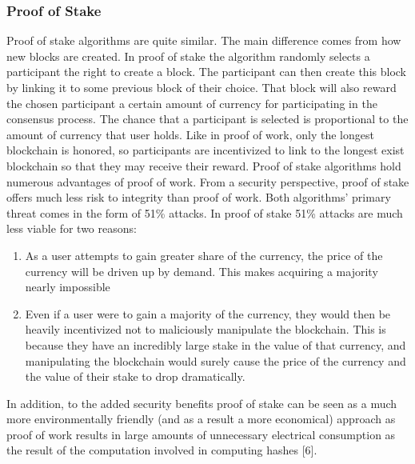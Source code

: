 \documentclass[11pt]{article}
\begin{document}
\subsubsection{Proof of Stake}
\label{sec:orgeb394c5}
Proof of stake algorithms are quite similar. The main difference comes from how new blocks are created. In proof of stake the algorithm randomly selects a participant the right to create a block. The participant can then create this block by linking it to some previous block of their choice. That block will also reward the chosen participant a certain amount of currency for participating in the consensus process. The chance that a participant is selected is proportional to the amount of currency that user holds. Like in proof of work, only the longest blockchain is honored, so participants are incentivized to link to the longest exist blockchain so that they may receive their reward. Proof of stake algorithms hold numerous advantages of proof of work. From a security perspective, proof of stake offers much less risk to integrity than proof of work. Both algorithms' primary threat comes in the form of 51\% attacks. In proof of stake 51\% attacks are much less viable for two reasons:
\begin{enumerate}
\item As a user attempts to gain greater share of the currency, the price of the currency will be driven up by demand. This makes acquiring a majority nearly impossible
\item Even if a user were to gain a majority of the currency, they would then be heavily incentivized not to maliciously manipulate the blockchain. This is because they have an incredibly large stake in the value of that currency, and manipulating the blockchain would surely cause the price of the currency and the value of their stake to drop dramatically.
\end{enumerate}
In addition, to the added security benefits proof of stake can be seen as a much more environmentally friendly (and as a result a more economical) approach as proof of work results in large amounts of unnecessary electrical consumption as the result of the computation involved in computing hashes [6].
\end{document}

